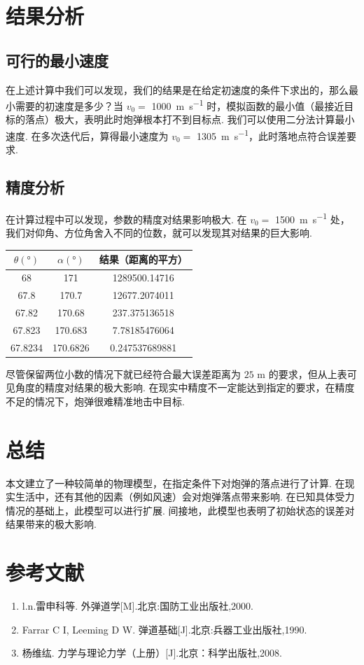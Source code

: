 \documentclass[UTF8]{ctexart}
\newcommand\cyr
{
	\renewcommand\rmdefault{wncyr}
	\renewcommand\sfdefault{wncyss}
	\renewcommand\encodingdefault{OT2}
	\normalfont
	\selectfont
}
\begin{document}
	\section{结果分析}
		\subsection{可行的最小速度}
		在上述计算中我们可以发现，我们的结果是在给定初速度的条件下求出的，那么最小需要的初速度是多少？当 $v_0 = $  \SI[per-mode=fraction,fraction-function=\sfrac]{1000}{\metre\per\second} 时，模拟函数的最小值（最接近目标的落点）极大，表明此时炮弹根本打不到目标点.
		我们可以使用二分法计算最小速度. 在多次迭代后，算得最小速度为 $v_0 = $  \SI[per-mode=fraction,fraction-function=\sfrac]{1305}{\metre\per\second}，此时落地点符合误差要求.
		\subsection{精度分析}
		在计算过程中可以发现，参数的精度对结果影响极大. 在 $v_0 = $ \SI[per-mode=fraction,fraction-function=\sfrac]{1500}{\metre\per\second} 处，我们对仰角、方位角舍入不同的位数，就可以发现其对结果的巨大影响.
		
		\begin{center}
			\begin{tabular}{|c|c|c|}
				\hline $\theta (°)$&$\alpha (°)$&结果（距离的平方）\\
				\hline 68&171&1289500.14716\\
				\hline 67.8&170.7&12677.2074011\\
				\hline 67.82&170.68&237.375136518\\
				\hline 67.823&170.683&7.78185476064\\
				\hline 67.8234&170.6826&0.247537689881\\
				\hline
			\end{tabular}
		\end{center}
		
		尽管保留两位小数的情况下就已经符合最大误差距离为 $25$ m 的要求，但从上表可见角度的精度对结果的极大影响. 在现实中精度不一定能达到指定的要求，在精度不足的情况下，炮弹很难精准地击中目标.
	\section{总结}
	本文建立了一种较简单的物理模型，在指定条件下对炮弹的落点进行了计算. 在现实生活中，还有其他的因素（例如风速）会对炮弹落点带来影响. 在已知具体受力情况的基础上，此模型可以进行扩展. 间接地，此模型也表明了初始状态的误差对结果带来的极大影响.
	\section{参考文献}
		\begin{enumerate}
			\item {\cyr l.n}.雷申科等. 外弹道学[M].北京:国防工业出版社,2000.
			\item Farrar C I, Leeming D W. 弹道基础[J].北京:兵器工业出版社,1990.
			\item 杨维纮. 力学与理论力学（上册）[J].北京：科学出版社,2008.
		\end{enumerate}
\end{document}
